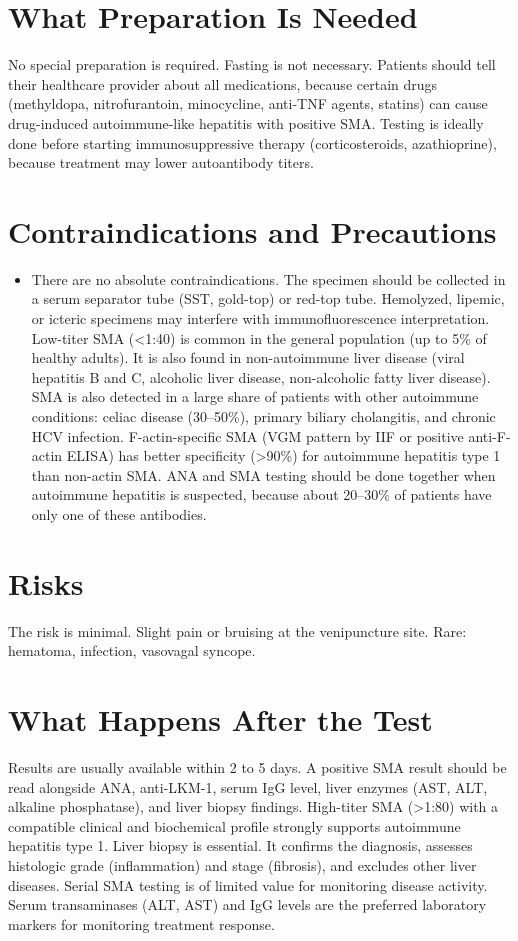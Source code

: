 \section*{What Preparation Is Needed}
No special preparation is required. Fasting is not necessary. Patients should tell their healthcare provider about all medications, because certain drugs (methyldopa, nitrofurantoin, minocycline, anti-TNF agents, statins) can cause drug-induced autoimmune-like hepatitis with positive SMA. Testing is ideally done before starting immunosuppressive therapy (corticosteroids, azathioprine), because treatment may lower autoantibody titers.

\section*{Contraindications and Precautions}
\begin{itemize}
  \item There are no absolute contraindications. The specimen should be collected in a serum separator tube (SST, gold-top) or red-top tube. Hemolyzed, lipemic, or icteric specimens may interfere with immunofluorescence interpretation. Low-titer SMA (<1:40) is common in the general population (up to 5\% of healthy adults). It is also found in non-autoimmune liver disease (viral hepatitis B and C, alcoholic liver disease, non-alcoholic fatty liver disease). SMA is also detected in a large share of patients with other autoimmune conditions: celiac disease (30--50\%), primary biliary cholangitis, and chronic HCV infection. F-actin-specific SMA (VGM pattern by IIF or positive anti-F-actin ELISA) has better specificity (>90\%) for autoimmune hepatitis type 1 than non-actin SMA. ANA and SMA testing should be done together when autoimmune hepatitis is suspected, because about 20--30\% of patients have only one of these antibodies.
\end{itemize}
\section*{Risks}
The risk is minimal. Slight pain or bruising at the venipuncture site. Rare: hematoma, infection, vasovagal syncope.

\section*{What Happens After the Test}
Results are usually available within 2 to 5 days. A positive SMA result should be read alongside ANA, anti-LKM-1, serum IgG level, liver enzymes (AST, ALT, alkaline phosphatase), and liver biopsy findings. High-titer SMA (>1:80) with a compatible clinical and biochemical profile strongly supports autoimmune hepatitis type 1. Liver biopsy is essential. It confirms the diagnosis, assesses histologic grade (inflammation) and stage (fibrosis), and excludes other liver diseases. Serial SMA testing is of limited value for monitoring disease activity. Serum transaminases (ALT, AST) and IgG levels are the preferred laboratory markers for monitoring treatment response.

